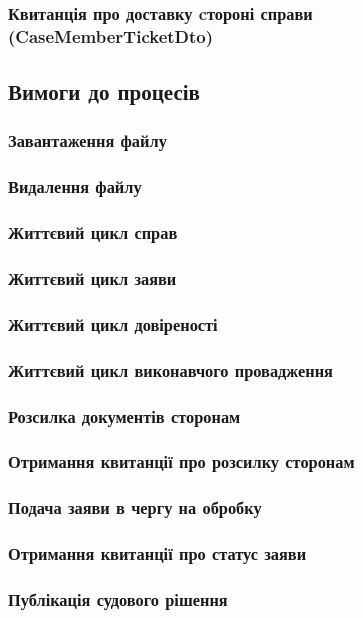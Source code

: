 \documentclass{article}
\begin{document}
\subsubsection{Квитанція про доставку cтороні справи (CaseMemberTicketDto)}

\newpage
\subsection{Вимоги до процесів}

\subsubsection{Завантаження файлу}
\subsubsection{Видалення файлу}
\subsubsection{Життєвий цикл справ}
\subsubsection{Життєвий цикл заяви}
\subsubsection{Життєвий цикл довіреності}
\subsubsection{Життєвий цикл виконавчого провадження}
\subsubsection{Розсилка документів сторонам}
\subsubsection{Отримання квитанції про розсилку сторонам}
\subsubsection{Подача заяви в чергу на обробку}
\subsubsection{Отримання квитанції про статус заяви}
\subsubsection{Публікація судового рішення}
\end{document}
